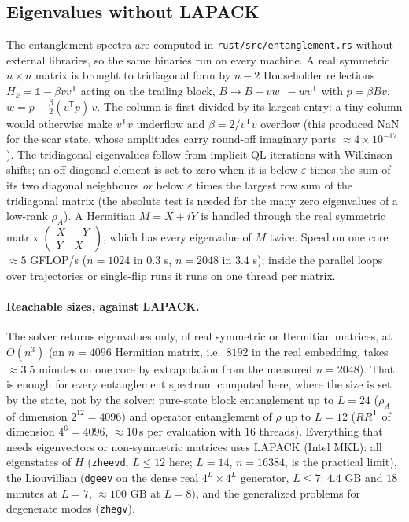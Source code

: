 \subsection{Eigenvalues without LAPACK}
\label{sec:nolapack}
The entanglement spectra are computed in \texttt{rust/src/entanglement.rs} without external libraries, so the same binaries run on every machine. A real symmetric $n\times n$ matrix is brought to tridiagonal form by $n-2$ Householder reflections $H_k = \mathds 1 - \beta vv^{\mathsf T}$ acting on the trailing block, $B \to B - vw^{\mathsf T} - wv^{\mathsf T}$ with $p = \beta Bv$, $w = p - \tfrac\beta2(v^{\mathsf T}p)\,v$. The column is first divided by its largest entry: a tiny column would otherwise make $v^{\mathsf T}v$ underflow and $\beta = 2/v^{\mathsf T}v$ overflow (this produced NaN for the scar state, whose amplitudes carry round-off imaginary parts $\approx 4\times10^{-17}$). The tridiagonal eigenvalues follow from implicit QL iterations with Wilkinson shifts; an off-diagonal element is set to zero when it is below $\varepsilon$ times the sum of its two diagonal neighbours \emph{or} below $\varepsilon$ times the largest row sum of the tridiagonal matrix (the absolute test is needed for the many zero eigenvalues of a low-rank $\rho_A$). A Hermitian $M = X + iY$ is handled through the real symmetric matrix $\begin{pmatrix}X & -Y\\ Y & X\end{pmatrix}$, which has every eigenvalue of $M$ twice. Speed on one core $\approx 5$ GFLOP/s ($n = 1024$ in $0.3$ s, $n = 2048$ in $3.4$ s); inside the parallel loops over trajectories or single-flip runs it runs on one thread per matrix.

\paragraph{Reachable sizes, against LAPACK.} The solver returns eigenvalues only, of real symmetric or Hermitian matrices, at $O(n^3)$ (an $n = 4096$ Hermitian matrix, i.e.\ $8192$ in the real embedding, takes $\approx 3.5$ minutes on one core by extrapolation from the measured $n = 2048$). That is enough for every entanglement spectrum computed here, where the size is set by the state, not by the solver: pure-state block entanglement up to $L = 24$ ($\rho_A$ of dimension $2^{12} = 4096$) and operator entanglement of $\rho$ up to $L = 12$ ($RR^{\mathsf T}$ of dimension $4^6 = 4096$, $\approx 10$\,s per evaluation with 16 threads). Everything that needs eigenvectors or non-symmetric matrices uses LAPACK (Intel MKL): all eigenstates of $H$ (\texttt{zheevd}, $L \le 12$ here; $L = 14$, $n = 16384$, is the practical limit), the Liouvillian (\texttt{dgeev} on the dense real $4^L \times 4^L$ generator, $L \le 7$: $4.4$ GB and $18$ minutes at $L = 7$, $\approx 100$ GB at $L = 8$), and the generalized problems for degenerate modes (\texttt{zhegv}).
